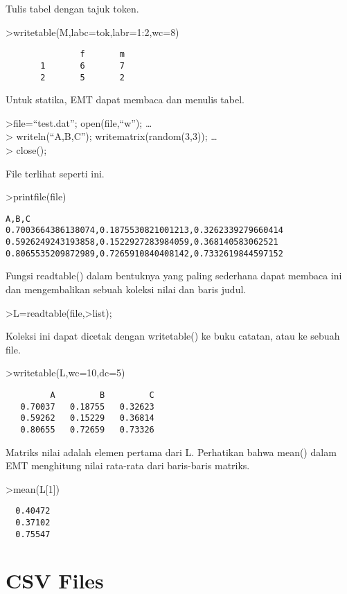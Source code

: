 \documentclass[
]{book}
\begin{document}
Tulis tabel dengan tajuk token.

\textgreater writetable(M,labc=tok,labr=1:2,wc=8)

\begin{verbatim}
               f       m
       1       6       7
       2       5       2
\end{verbatim}

Untuk statika, EMT dapat membaca dan menulis tabel.

\textgreater file=``test.dat''; open(file,``w''); \ldots{}\\
\textgreater{} writeln(``A,B,C''); writematrix(random(3,3)); \ldots{}\\
\textgreater{} close();

File terlihat seperti ini.

\textgreater printfile(file)

\begin{verbatim}
A,B,C
0.7003664386138074,0.1875530821001213,0.3262339279660414
0.5926249243193858,0.1522927283984059,0.368140583062521
0.8065535209872989,0.7265910840408142,0.7332619844597152
\end{verbatim}

Fungsi readtable() dalam bentuknya yang paling sederhana dapat membaca ini dan mengembalikan sebuah koleksi nilai dan baris judul.

\textgreater L=readtable(file,\textgreater list);

Koleksi ini dapat dicetak dengan writetable() ke buku catatan, atau ke sebuah file.

\textgreater writetable(L,wc=10,dc=5)

\begin{verbatim}
         A         B         C
   0.70037   0.18755   0.32623
   0.59262   0.15229   0.36814
   0.80655   0.72659   0.73326
\end{verbatim}

Matriks nilai adalah elemen pertama dari L. Perhatikan bahwa mean() dalam EMT menghitung nilai rata-rata dari baris-baris matriks.

\textgreater mean(L{[}1{]})

\begin{verbatim}
  0.40472 
  0.37102 
  0.75547 
\end{verbatim}

\section{CSV Files}\label{csv-files}
\end{document}
